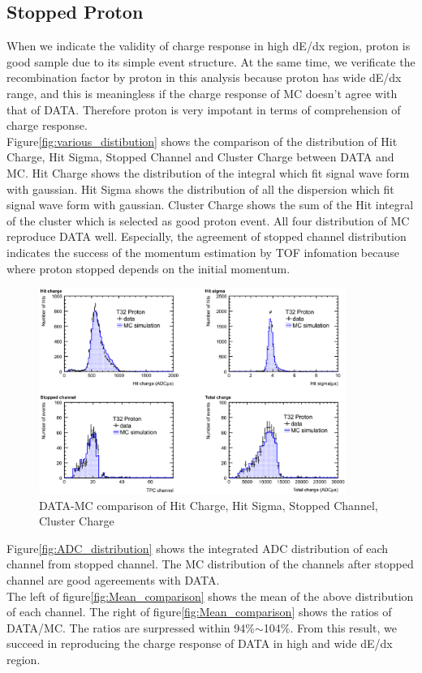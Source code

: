 \subsection{Stopped Proton}

When we indicate the validity of charge response in high dE/dx region, proton is good sample due to its simple event structure.
At the same time, we verificate the recombination factor by proton in this analysis because proton has wide dE/dx range, and this is meaningless if the charge response of MC doesn't agree with that of DATA.
Therefore proton is very impotant in terms of comprehension of charge response.\\
Figure\ref{fig:various_distibution} shows the comparison of the distribution of Hit Charge, Hit Sigma, Stopped Channel and  Cluster Charge between DATA and MC.
Hit Charge shows the distribution of the integral which fit signal wave form  with gaussian.
Hit Sigma shows the distribution of all the dispersion which fit signal wave form with gaussian.
Cluster Charge shows the sum of the Hit integral of the cluster which is selected as good proton event.
All four distribution of MC reproduce DATA well.
Especially, the agreement of stopped channel distribution indicates the success of the momentum estimation by TOF infomation because where proton stopped depends on the initial momentum.\\

\begin{figure}[htbp]
  \centering
  \includegraphics[width=10cm,clip]{./fig/stop_proton1.eps}
  \caption{DATA-MC comparison of Hit Charge, Hit Sigma, Stopped Channel, Cluster Charge}
  \label{fig:varios_distribution}
\end{figure}

Figure\ref{fig:ADC_distribution} shows the integrated ADC distribution of each channel from stopped channel.
The MC distribution of the channels after stopped channel are good agereements with DATA.\\
The left of figure\ref{fig:Mean_comparison} shows the mean of the above distribution of each channel.
The right of figure\ref{fig:Mean_comparison} shows the ratios of DATA/MC.
The ratios are surpressed within 94\%$\sim$104\%.
From this result, we succeed in reproducing the charge response of DATA in high and wide dE/dx region.

